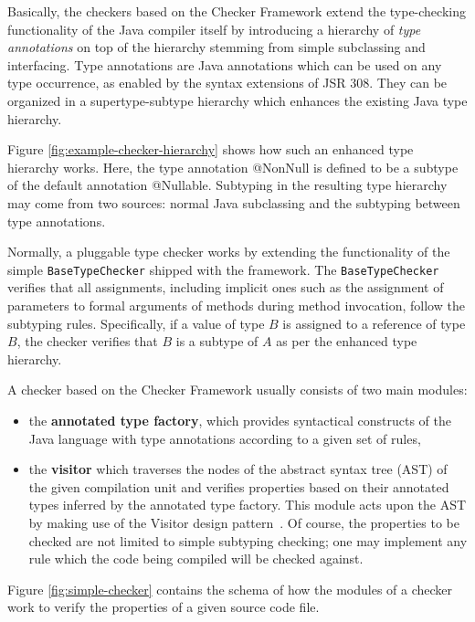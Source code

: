 \documentclass{pracamgr}
\theoremstyle{break}
\theoremstyle{break}
\theoremstyle{break}
\begin{document}
Basically, the checkers based on the Checker Framework extend the
type-checking functionality of the Java compiler itself by introducing
a hierarchy of \emph{type annotations} on top of the hierarchy
stemming from simple subclassing and interfacing. Type annotations are
Java annotations which can be used on any type occurrence, as enabled
by the syntax extensions of JSR 308. They can be organized in a
supertype-subtype hierarchy which enhances the existing Java type
hierarchy.

Figure \ref{fig:example-checker-hierarchy} shows how such an enhanced
type hierarchy works. Here, the type annotation @NonNull is defined to
be a subtype of the default annotation @Nullable. Subtyping in the
resulting type hierarchy may come from two sources: normal Java
subclassing and the subtyping between type annotations.

Normally, a pluggable type checker works by extending the
functionality of the simple \texttt{BaseTypeChecker} shipped with the
framework. The \texttt{BaseTypeChecker} verifies that all assignments,
including implicit ones such as the assignment of parameters to formal
arguments of methods during method invocation, follow the subtyping
rules. Specifically, if a value of type $B$ is assigned to a reference
of type $B$, the checker verifies that $B$ is a subtype of $A$ as per
the enhanced type hierarchy.

A checker based on the Checker Framework usually consists of two main
modules:
\begin{itemize}
\item the \textbf{annotated type factory}, which provides syntactical
  constructs of the Java language with type annotations according to a
  given set of rules,
\item the \textbf{visitor} which traverses the nodes of the abstract
  syntax tree (AST) of the given compilation unit and verifies
  properties based on their annotated types inferred by the annotated
  type factory. This module acts upon the AST by making use of the
  Visitor design pattern~\cite{visitor1, visitor2}. Of course, the properties to
  be checked are not limited to simple subtyping checking; one may
  implement any rule which the code being compiled will be checked
  against.
\end{itemize}
Figure \ref{fig:simple-checker} contains the schema of how the modules
of a checker work to verify the properties of a given source code
file.
\end{document}
